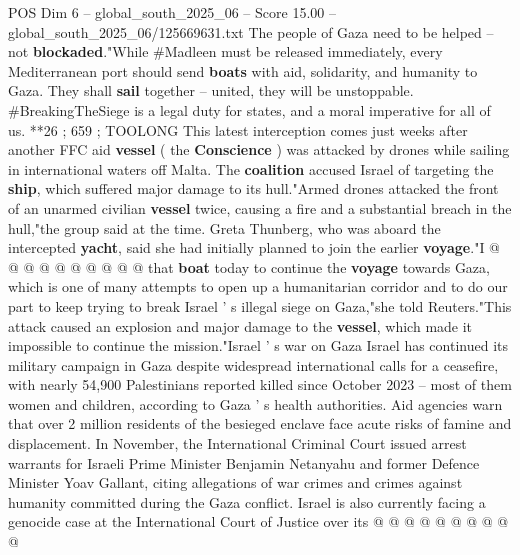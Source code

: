 \begin{textsample}{POS Dim 6 – global\_south\_2025\_06 – Score 15.00 – global\_south\_2025\_06/125669631.txt}
The people of Gaza need to be helped -- not \textbf{blockaded}."While \#Madleen must be released immediately, every Mediterranean port should send \textbf{boats} with aid, solidarity, and humanity to Gaza.
They shall \textbf{sail} together -- united, they will be unstoppable. \#BreakingTheSiege is a legal duty for states, and a moral imperative for all of us. **26 ; 659 ; TOOLONG This latest interception comes just weeks after another FFC aid \textbf{vessel} ( the \textbf{Conscience} ) was attacked by drones while sailing in international waters off Malta.
The \textbf{coalition} accused Israel of targeting the \textbf{ship}, which suffered major damage to its hull."Armed drones attacked the front of an unarmed civilian \textbf{vessel} twice, causing a fire and a substantial breach in the hull,"the group said at the time.
Greta Thunberg, who was aboard the intercepted \textbf{yacht}, said she had initially planned to join the earlier \textbf{voyage}."I @ @ @ @ @ @ @ @ @ @ that \textbf{boat} today to continue the \textbf{voyage} towards Gaza, which is one of many attempts to open up a humanitarian corridor and to do our part to keep trying to break Israel ' s illegal siege on Gaza,"she told Reuters."This attack caused an explosion and major damage to the \textbf{vessel}, which made it impossible to continue the mission."Israel ' s war on Gaza Israel has continued its military campaign in Gaza despite widespread international calls for a ceasefire, with nearly 54,900 Palestinians reported killed since October 2023 -- most of them women and children, according to Gaza ' s health authorities.
Aid agencies warn that over 2 million residents of the besieged enclave face acute risks of famine and displacement.
In November, the International Criminal Court issued arrest warrants for Israeli Prime Minister Benjamin Netanyahu and former Defence Minister Yoav Gallant, citing allegations of war crimes and crimes against humanity committed during the Gaza conflict.
Israel is also currently facing a genocide case at the International Court of Justice over its @ @ @ @ @ @ @ @ @ @

\end{textsample}
